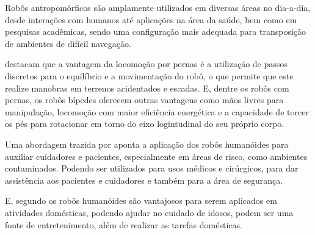 Robôs antropomórficos são amplamente utilizados em diversas áreas no dia-a-dia, desde interações com humanos até aplicações na área da saúde, bem como em pesquisas acadêmicas, sendo uma configuração mais adequada para transposição de ambientes de difícil navegação.

 destacam que a vantagem da locomoção por pernas é a utilização de passos discretos para o equilíbrio e a movimentação do robô, o que permite que este realize manobras em terrenos acidentados e escadas. E, dentre os robôs com pernas, os robôs bípedes oferecem outras vantagens como mãos livres para manipulação, locomoção com maior eficiência energética e a capacidade de torcer os pés para rotacionar em torno do eixo logintudinal do seu próprio corpo.

Uma abordagem trazida por  aponta a aplicação dos robôs humanóides para auxiliar cuidadores e pacientes, especialmente em áreas de risco, como ambientes contaminados. Podendo ser utilizados para usos médicos e cirúrgicos, para dar assistência aos pacientes e cuidadores e também para a área de segurança.

E, segundo  os robôs humanóides são vantajosos para serem aplicados em atividades domésticas, podendo ajudar no cuidado de idosos, podem ser uma fonte de entretenimento, além de realizar as tarefas domésticas.
